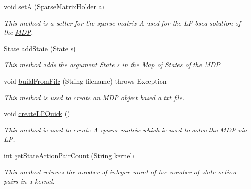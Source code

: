 \begin{DoxyCompactItemize}
void \hyperlink{classese_1_1seas_1_1upenn_1_1edu_1_1_m_d_p_a1d46e0b774323aa26cebd2b3c2f947dc}{set\+A} (\hyperlink{classese_1_1seas_1_1upenn_1_1edu_1_1_sparse_matrix_holder}{Sparse\+Matrix\+Holder} a)
\begin{DoxyCompactList}\small\item\em This method is a setter for the sparse matrix A used for the L\+P bsed solution of the \hyperlink{classese_1_1seas_1_1upenn_1_1edu_1_1_m_d_p}{M\+D\+P}. \end{DoxyCompactList}\item 
\hyperlink{classese_1_1seas_1_1upenn_1_1edu_1_1_state}{State} \hyperlink{classese_1_1seas_1_1upenn_1_1edu_1_1_m_d_p_a483e8c4fa59984e5b653686bc4a343c4}{add\+State} (\hyperlink{classese_1_1seas_1_1upenn_1_1edu_1_1_state}{State} s)
\begin{DoxyCompactList}\small\item\em This method adds the argument \hyperlink{classese_1_1seas_1_1upenn_1_1edu_1_1_state}{State} s in the Map of States of the \hyperlink{classese_1_1seas_1_1upenn_1_1edu_1_1_m_d_p}{M\+D\+P}. \end{DoxyCompactList}\item 
void \hyperlink{classese_1_1seas_1_1upenn_1_1edu_1_1_m_d_p_ae5da8ca2a3ae73ffc832cb4626ed2ace}{build\+From\+File} (String filename)  throws Exception 	
\begin{DoxyCompactList}\small\item\em This method is used to create an \hyperlink{classese_1_1seas_1_1upenn_1_1edu_1_1_m_d_p}{M\+D\+P} object based a txt file. \end{DoxyCompactList}\item 
void \hyperlink{classese_1_1seas_1_1upenn_1_1edu_1_1_m_d_p_a23631cbc791e50769e7c5dff9e61fe0c}{create\+L\+P\+Quick} ()
\begin{DoxyCompactList}\small\item\em This method is used to create A sparse matrix which is used to solve the \hyperlink{classese_1_1seas_1_1upenn_1_1edu_1_1_m_d_p}{M\+D\+P} via L\+P. \end{DoxyCompactList}\item 
int \hyperlink{classese_1_1seas_1_1upenn_1_1edu_1_1_m_d_p_a701c0f156143fddf41c41d94b6df7bb5}{get\+State\+Action\+Pair\+Count} (String kernel)
\begin{DoxyCompactList}\small\item\em This method returns the number of integer count of the number of state-\/action pairs in a kernel. \end{DoxyCompactList}\item 

\end{DoxyCompactItemize}
